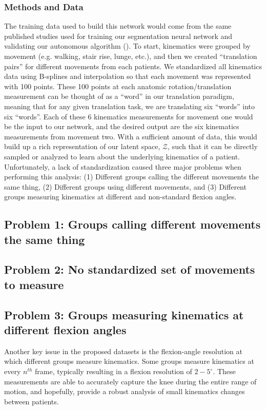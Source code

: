 \subsubsection{Methods and Data}
The training data used to build this network would come from the same published studies used for training our segmentation neural network and validating our autonomous algorithm ().
To start, kinematics were grouped by movement (e.g. walking, stair rise, lunge, etc.), and then we created ``translation pairs'' for different movements from each patients.
We standardized all kinematics data using B-splines and interpolation so that each movement was represented with 100 points.
These 100 points at each anatomic rotation/translation measurement can be thought of as a ``word'' in our translation paradigm, meaning that for any given translation task, we are translating six ``words'' into six ``words''.
Each of these 6 kinematics measurements for movement one would be the input to our network, and the desired output are the six kinematics measurements from movement two.
With a sufficient amount of data, this would build up a rich representation of our latent space, $\mathcal{Z}$, such that it can be directly sampled or analyzed to learn about the underlying kinematics of a patient.
Unfortunately, a lack of standardization caused three major problems when performing this analysis: (1) Different groups calling the different movements the same thing, (2) Different groups using different movements, and (3) Different groups measuring kinematics at different and non-standard flexion angles.

\subsection{Problem 1: Groups calling different movements the same thing}
\subsection{Problem 2: No standardized set of movements to measure}

\subsection{Problem 3: Groups measuring kinematics at different flexion angles}
Another key issue in the proposed datasets is the flexion-angle resolution at which different groups measure kinematics.
Some groups measure kinematics at every $n^{th}$ frame, typically resulting in a flexion resolution of $2-5^{\circ}$.
These measurements are able to accurately capture the knee during the entire range of motion, and hopefully, provide a robust analysis of small kinematics changes between patients.


